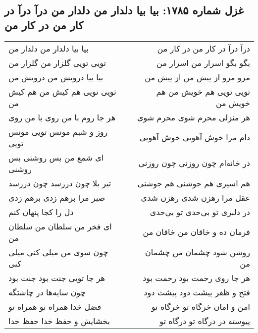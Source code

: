 \begin{center}
\section*{غزل شماره ۱۷۸۵: بیا بیا دلدار من دلدار من درآ درآ در کار من در کار من}
\label{sec:1785}
\begin{longtable}{l p{0.5cm} r}
بیا بیا دلدار من دلدار من
&&
درآ درآ در کار من در کار من
\\
تویی تویی گلزار من گلزار من
&&
بگو بگو اسرار من اسرار من
\\
بیا بیا درویش من درویش من
&&
مرو مرو از پیش من از پیش من
\\
تویی تویی هم کیش من هم کیش من
&&
تویی تویی هم خویش من هم خویش من
\\
هر جا روم با من روی با من روی
&&
هر منزلی محرم شوی محرم شوی
\\
روز و شبم مونس تویی مونس تویی
&&
دام مرا خوش آهویی خوش آهویی
\\
ای شمع من بس روشنی بس روشنی
&&
در خانه‌ام چون روزنی چون روزنی
\\
تیر بلا چون دررسد چون دررسد
&&
هم اسپری هم جوشنی هم جوشنی
\\
صبر مرا برهم زدی برهم زدی
&&
عقل مرا رهزن شدی رهزن شدی
\\
دل را کجا پنهان کنم
&&
در دلبری تو بی‌حدی تو بی‌حدی
\\
ای فخر من سلطان من سلطان من
&&
فرمان ده و خاقان من خاقان من
\\
چون سوی من میلی کنی میلی کنی
&&
روشن شود چشمان من چشمان من
\\
هر جا تویی جنت بود جنت بود
&&
هر جا روی رحمت بود رحمت بود
\\
چون سایه‌ها در چاشتگه
&&
فتح و ظفر پیشت دود پیشت دود
\\
فضل خدا همراه تو همراه تو
&&
امن و امان خرگاه تو خرگاه تو
\\
بخشایش و حفظ خدا حفظ خدا
&&
پیوسته در درگاه تو درگاه تو
\\
\end{longtable}
\end{center}
